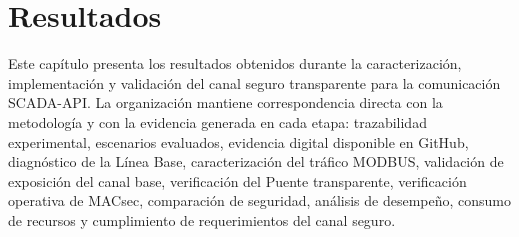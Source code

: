\setcounter{secnumdepth}{5}
\chapter{Resultados}
\label{cap:resultados}

\glsresetall

Este capítulo presenta los resultados obtenidos durante la caracterización, implementación y validación del canal seguro transparente para la comunicación \gls{SCADA}-\gls{API}. La organización mantiene correspondencia directa con la metodología y con la evidencia generada en cada etapa: trazabilidad experimental, escenarios evaluados, evidencia digital disponible en GitHub, diagnóstico de la Línea Base, caracterización del tráfico \gls{MODBUS}, validación de exposición del canal base, verificación del Puente transparente, verificación operativa de \gls{MACsec}, comparación de seguridad, análisis de desempeño, consumo de recursos y cumplimiento de requerimientos del canal seguro.


